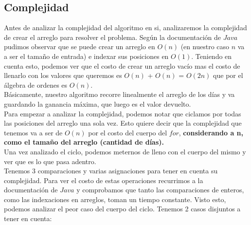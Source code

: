 
\clearpage
\subsection{Complejidad}
\indent Antes de analizar la complejidad del algoritmo en si, analizaremos la
complejidad de crear el arreglo para resolver el problema. Según la
documentación de $Java$ pudimos observar que se puede crear un arreglo en $O(n)$
(en nuestro caso $n$ va a ser el tamaño de entrada)
e indexar sus posiciones en $O(1)$. Teniendo en cuenta esto, podemos ver que el
costo de crear un arreglo vacío mas el costo de llenarlo con los valores que
queremos es $O(n)$ + $O(n)$ = $O(2n)$ que por el álgebra de ordenes es $O(n)$.\\
\indent Básicamente, nuestro algoritmo recorre linealmente el arreglo de los
días y va guardando la ganancia máxima, que luego es el valor devuelto.\\
\indent Para empezar a analizar la complejidad, podemos notar que ciclamos por
todas las posiciones del arreglo una sola vez. Esto quiere decir que la
complejidad que tenemos va a ser de $O(n)$ por el costo del cuerpo del $for$,
\textbf{considerando a n, como el tamaño del arreglo (cantidad de días).}\\
\indent Una vez analizado el ciclo, podemos meternos de lleno con el cuerpo del
mismo y ver que es lo que pasa adentro.\\
\indent Tenemos 3 comparaciones y varias asignaciones para tener en cuenta su
complejidad. Para ver el costo de estas operaciones recurrimos a la
documentación de $Java$ y comprobamos que tanto las comparaciones de enteros,
como las indexaciones en arreglos, toman un tiempo constante. Visto esto,
podemos analizar el peor caso del cuerpo del ciclo. Tenemos 2 casos disjuntos a
tener en cuenta:

